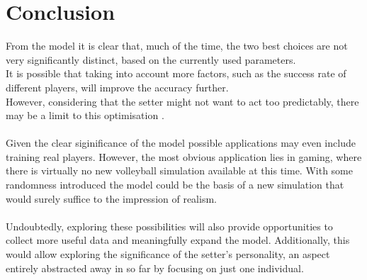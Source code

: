 \documentclass[main.tex]{subfiles}
\begin{document}
  \section{Conclusion}
    
    From the model it is clear that, much of the time, the two best choices are not very significantly distinct, based on the currently used parameters. \\
    It is possible that taking into account more factors, such as the success rate of different players, will improve the accuracy further. \\
    However, considering that the setter might not want to act too predictably, there may be a limit to this optimisation  \cite[chapter 3.1]{gameTheory}.
    \\\\
    Given the clear siginificance of the model possible applications may even include training real players. However, the most obvious application lies in gaming, where there is virtually no new volleyball simulation available at this time. With some randomness introduced the model could be the basis of a new simulation that would surely suffice to the impression of realism.
    \\\\
    Undoubtedly, exploring these possibilities will also provide opportunities to collect more useful data and meaningfully expand the model. Additionally, this would allow exploring the significance of the setter's personality, an aspect entirely abstracted away in so far by focusing on just one individual.
    
\end{document}
